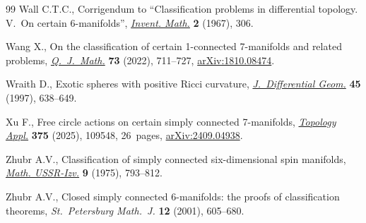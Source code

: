 \documentclass[10pt,a4paper]{amsart}
\numberwithin{equation}{section}
\theoremstyle{definition}
\numberwithin{table}{section}
\begin{document}
\begin{thebibliography}{99}
Wall C.T.C., Corrigendum to ``Classification problems in differential topology.
  {V}.~{O}n certain {$6$}-manifolds'',
  \href{https://doi.org/10.1007/BF01425407}{\textit{Invent. Math.}} \textbf{2}
  (1967), 306.

Wang X., On the classification of certain 1-connected 7-manifolds and related
  problems, \href{https://doi.org/10.1093/qmath/haab053}{\textit{Q.~J.~Math.}}
  \textbf{73} (2022), 711--727,
  \href{https://arxiv.org/abs/1810.08474}{arXiv:1810.08474}.

Wraith D., Exotic spheres with positive {R}icci curvature,
  \href{https://doi.org/10.4310/jdg/1214459846}{\textit{J.~Differential Geom.}}
  \textbf{45} (1997), 638--649.

Xu F., Free circle actions on certain simply connected 7-manifolds,
  \href{https://doi.org/10.1016/j.topol.2025.109548}{\textit{Topology Appl.}}
  \textbf{375} (2025), 109548, 26~pages,
  \href{https://arxiv.org/abs/2409.04938}{arXiv:2409.04938}.

Zhubr A.V., Classification of simply connected six-dimensional spin manifolds,
  \href{https://doi.org/10.1070/IM1975v009n04ABEH001498}{\textit{Math.
  USSR-Izv.}} \textbf{9} (1975), 793--812.

Zhubr A.V., Closed simply connected 6-manifolds: the proofs of classification
  theorems, \textit{St.~Petersburg Math.~J.} \textbf{12} (2001), 605--680.

\end{thebibliography}
\end{document}
